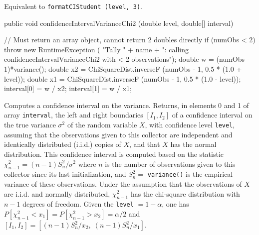 \begin{tabb}   Equivalent to \texttt{formatCIStudent (level, 3)}.
\end{tabb}
\begin{htmlonly}
\end{htmlonly}
\begin{code}

   public void confidenceIntervalVarianceChi2 (double level,
                                               double[] interval) \begin{hide} {
      // Must return an array object, cannot return 2 doubles directly
      if (numObs < 2) throw new RuntimeException (
          "Tally " + name +
          ":   calling confidenceIntervalVarianceChi2 with < 2 observations");
      double w = (numObs - 1)*variance();
      double x2 = ChiSquareDist.inverseF (numObs - 1, 0.5 * (1.0 + level));
      double x1 = ChiSquareDist.inverseF (numObs - 1, 0.5 * (1.0 - level));
      interval[0] = w / x2;
      interval[1] = w / x1;
   }\end{hide}
\end{code}
\begin{tabb} Computes a confidence interval on the variance.
  Returns, in elements 0 and 1 of array \texttt{interval}, the
  left and right boundaries $[I_1,I_2]$ of a confidence interval on the true
 variance $\sigma^2$ of the random variable $X$, with confidence level
  \texttt{level}, assuming that the observations
  given to this collector are independent and identically distributed
  (i.i.d.) copies of $X$, and that $X$ has the normal distribution.
  This confidence interval is computed based on the statistic
  $    \chi^2_{n-1} = (n-1)S^2_{n}/\sigma^2  $
  where $n$ is the number of observations given to this collector since its
  last initialization, and $S^2_n =$ \texttt{variance()} is the empirical
  variance of these observations.  Under the assumption that the observations
  of $X$ are  i.i.d.{} and normally distributed,
  $\chi^2_{n-1}$ has the chi-square distribution with $n-1$ degrees of freedom.
  Given the \texttt{level} $ = 1 - \alpha$,
  one has $P[\chi^2_{n-1} < x_1] = P[\chi^2_{n-1} > x_2] = \alpha/2$
  and $[I_1,I_2] = [(n-1)S^2_{n}/x_2,\; (n-1)S^2_{n}/x_1]$.
\end{tabb}
